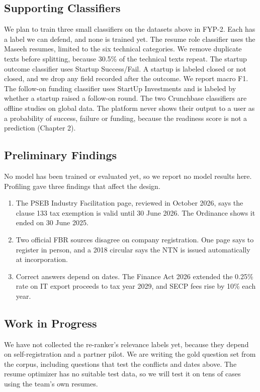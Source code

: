 \documentclass{FastFyp}
\begin{document}
\subsection{Supporting Classifiers}
\label{sec:classifiers}
We plan to train three small classifiers on the datasets above in FYP-2. Each has a label we can defend, and none is trained yet. The resume role classifier uses the Maseeh resumes, limited to the six technical categories. We remove duplicate texts before splitting, because 30.5\% of the technical texts repeat. The startup outcome classifier uses Startup Success/Fail. A startup is labeled closed or not closed, and we drop any field recorded after the outcome. We report macro F1. The follow-on funding classifier uses StartUp Investments and is labeled by whether a startup raised a follow-on round. The two Crunchbase classifiers are offline studies on global data. The platform never shows their output to a user as a probability of success, failure or funding, because the readiness score is not a prediction (Chapter 2).

\subsection{Preliminary Findings}
No model has been trained or evaluated yet, so we report no model results here. Profiling gave three findings that affect the design.
\begin{enumerate}
    \item The PSEB Industry Facilitation page, reviewed in October 2026, says the clause 133 tax exemption is valid until 30 June 2026. The Ordinance shows it ended on 30 June 2025.
    \item Two official FBR sources disagree on company registration. One page says to register in person, and a 2018 circular says the NTN is issued automatically at incorporation.
    \item Correct answers depend on dates. The Finance Act 2026 extended the 0.25\% rate on IT export proceeds to tax year 2029, and SECP fees rise by 10\% each year.
\end{enumerate}

\subsection{Work in Progress}
We have not collected the re-ranker's relevance labels yet, because they depend on self-registration and a partner pilot. We are writing the gold question set from the corpus, including questions that test the conflicts and dates above. The resume optimizer has no suitable test data, so we will test it on tens of cases using the team's own resumes.
\end{document}
